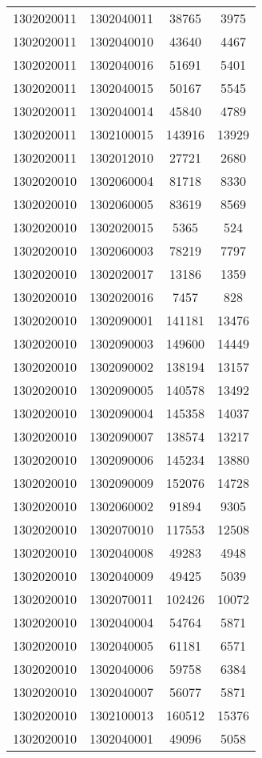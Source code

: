 \begin{longtable}[h]{llcc}
		1302020011 & 1302040011 & 38765 & 3975\\
		1302020011 & 1302040010 & 43640 & 4467\\
		1302020011 & 1302040016 & 51691 & 5401\\
		1302020011 & 1302040015 & 50167 & 5545\\
		1302020011 & 1302040014 & 45840 & 4789\\
		1302020011 & 1302100015 & 143916 & 13929\\
		1302020011 & 1302012010 & 27721 & 2680\\
		1302020010 & 1302060004 & 81718 & 8330\\
		1302020010 & 1302060005 & 83619 & 8569\\
		1302020010 & 1302020015 & 5365 & 524\\
		1302020010 & 1302060003 & 78219 & 7797\\
		1302020010 & 1302020017 & 13186 & 1359\\
		1302020010 & 1302020016 & 7457 & 828\\
		1302020010 & 1302090001 & 141181 & 13476\\
		1302020010 & 1302090003 & 149600 & 14449\\
		1302020010 & 1302090002 & 138194 & 13157\\
		1302020010 & 1302090005 & 140578 & 13492\\
		1302020010 & 1302090004 & 145358 & 14037\\
		1302020010 & 1302090007 & 138574 & 13217\\
		1302020010 & 1302090006 & 145234 & 13880\\
		1302020010 & 1302090009 & 152076 & 14728\\
		1302020010 & 1302060002 & 91894 & 9305\\
		1302020010 & 1302070010 & 117553 & 12508\\
		1302020010 & 1302040008 & 49283 & 4948\\
		1302020010 & 1302040009 & 49425 & 5039\\
		1302020010 & 1302070011 & 102426 & 10072\\
		1302020010 & 1302040004 & 54764 & 5871\\
		1302020010 & 1302040005 & 61181 & 6571\\
		1302020010 & 1302040006 & 59758 & 6384\\
		1302020010 & 1302040007 & 56077 & 5871\\
		1302020010 & 1302100013 & 160512 & 15376\\
		1302020010 & 1302040001 & 49096 & 5058\\

\end{longtable}
